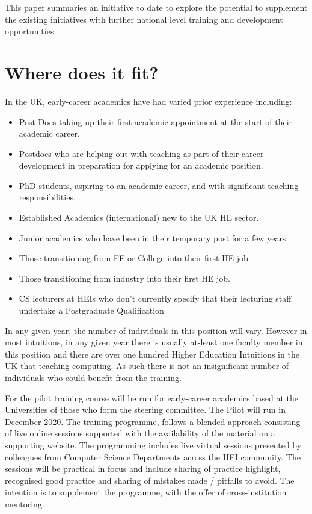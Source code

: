 \documentclass[sigconf]{acmart}
\begin{document}
This paper summaries an initiative to date to explore the potential to supplement the existing initiatives with further national level training and development opportunities.

\section{Where does it fit?}
In the UK, early-career academics have had varied prior experience including:
\begin{itemize}
\item Post Docs taking up their first academic appointment at the start of their academic career.
\item Postdocs who are helping out with teaching as part of their career development in preparation for applying for an academic position.
\item PhD students, aspiring to an academic career, and with significant teaching responsibilities.
\item Established Academics (international) new to the UK HE sector.
\item Junior academics who have been in their temporary post for a few years.
\item Those transitioning from FE or College into their first HE job.
\item Those transitioning from industry into their first HE job.
\item CS lecturers at HEIs who don’t currently specify that their lecturing staff undertake  a Postgraduate Qualification
\end{itemize}

In any given year, the number of individuals in this position will vary. However in most intuitions, in any given year there is usually at-least one faculty member in this position and there are over one hundred Higher Education Intuitions in the UK that teaching computing. As such there is not an insignificant number of individuals who could benefit from the training.

For the pilot training course will be run for early-career academics based at the Universities of those who form the steering committee. The Pilot will run in December 2020. The training programme, follows a blended approach consisting of live online sessions supported with the availability of the material on a supporting website. The programming includes live virtual sessions presented by colleagues from Computer Science Departments across the HEI community. The sessions will be practical in focus and include sharing of practice highlight, recognised good practice and sharing of mistakes made / pitfalls to avoid. The intention is to supplement the programme, with the offer of cross-institution mentoring.
\end{document}
